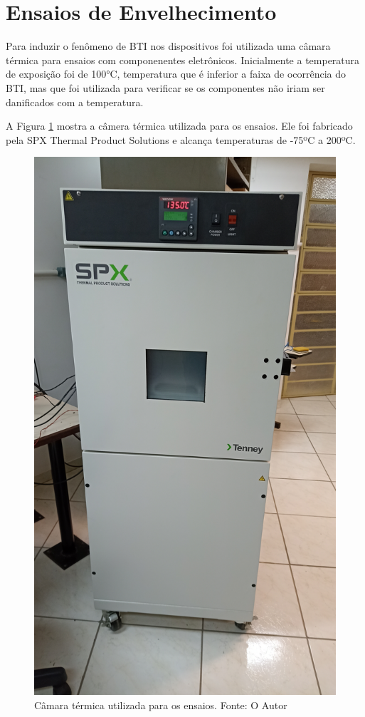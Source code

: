 \section{Ensaios de Envelhecimento}

Para induzir o fenômeno de BTI nos dispositivos foi utilizada uma câmara térmica para ensaios com componenentes eletrônicos. Inicialmente a temperatura de exposição foi de 100°C, temperatura que é inferior a faixa de ocorrência do BTI, mas que foi utilizada para verificar se os componentes não iriam ser danificados com a temperatura.

A Figura \ref{fig:CamTerm} mostra a câmera térmica utilizada para os ensaios. Ele foi fabricado pela SPX Thermal Product Solutions e alcança temperaturas de -75ºC a 200ºC.

\begin{figure}[H]
    \centering
    \includegraphics[angle=270, scale=0.08]{figures/Metodologia/Ensaios_CamaraTermica.jpg}
    \caption{Câmara térmica utilizada para os ensaios. Fonte: O Autor}
    \label{fig:CamTerm}
\end{figure}

